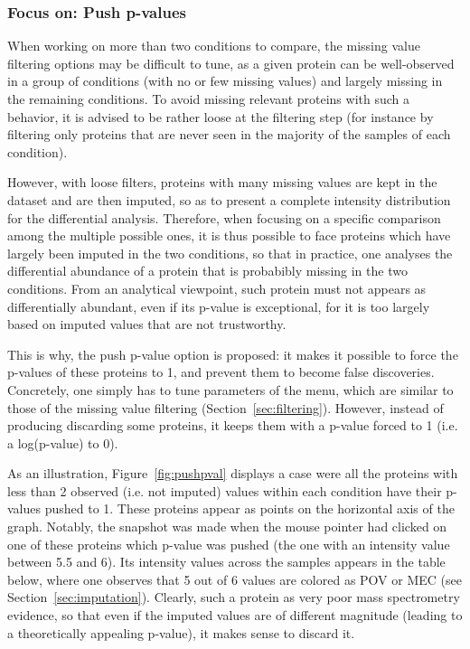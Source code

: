 \documentclass[12pt]{article}
\begin{document}
\subsubsection{Focus on: Push p-values}\label{sec:pushpval}
When working on more than two conditions to compare, the missing value filtering options may be difficult to tune, as a given protein can be well-observed in a group of conditions (with no or few missing values) and largely missing in the remaining conditions. To avoid missing relevant proteins with such a behavior, it is advised to be rather loose at the filtering step (for instance by filtering only proteins that are never seen in the majority of the samples of each condition). %

However, with loose filters, proteins with many missing values are kept in the dataset and are then imputed, so as to present a complete intensity distribution for the differential analysis.
Therefore, when focusing on a specific comparison among the multiple possible ones, it is thus possible to face proteins which have largely been imputed in the two conditions, so that in practice, one analyses the differential abundance of a protein that is probabibly missing in the two conditions. From an analytical viewpoint, such protein must not appears as differentially abundant, even if its p-value is exceptional, for it is too largely based on imputed values that are not trustworthy.

This is why, the push p-value option is proposed: it makes it possible to force the p-values of these proteins to 1, and prevent them to become false discoveries. Concretely, one simply has to tune 
parameters of the menu, which are similar to those of the missing value filtering (Section~\ref{sec:filtering}). However, instead of producing discarding some proteins, it keeps them with a p-value forced to 1 (i.e. a log(p-value) to 0).

As an illustration, Figure~\ref{fig:pushpval} displays a case were all the proteins with less than 2 observed (i.e. not imputed) values within each condition have their p-values pushed to 1. These proteins appear as points on the horizontal axis of the graph. Notably, the snapshot was made when the mouse pointer had clicked on one of these proteins which p-value was pushed (the one with an intensity value between 5.5 and 6). Its intensity values across the samples appears in the table below, where one observes that 5 out of 6 values are colored as POV or MEC (see Section~\ref{sec:imputation}). Clearly, such a protein as very poor mass spectrometry evidence, so that even if the imputed values are of different magnitude (leading to a theoretically appealing p-value), it makes sense to discard it.
\end{document}
